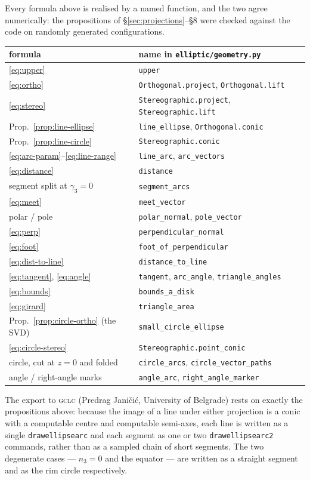\documentclass[11pt,a4paper]{article}
\newcommand{\code}[1]{\texttt{#1}}
\theoremstyle{plain}
\theoremstyle{definition}
\theoremstyle{remark}
\begin{document}
Every formula above is realised by a named function, and the two agree
numerically: the propositions of \S\ref{sec:projections}--\S8 were checked
against the code on randomly generated configurations.

\begin{center}
\small
\begin{tabular}{@{}ll@{}}
\toprule
\textbf{formula} & \textbf{name in \code{elliptic/geometry.py}} \\
\midrule
\eqref{eq:upper} & \code{upper} \\
\eqref{eq:ortho} & \code{Orthogonal.project}, \code{Orthogonal.lift} \\
\eqref{eq:stereo} & \code{Stereographic.project}, \code{Stereographic.lift} \\
Prop.~\ref{prop:line-ellipse} & \code{line\_ellipse}, \code{Orthogonal.conic} \\
Prop.~\ref{prop:line-circle} & \code{Stereographic.conic} \\
\eqref{eq:arc-param}--\eqref{eq:line-range} & \code{line\_arc}, \code{arc\_vectors} \\
\eqref{eq:distance} & \code{distance} \\
segment split at $\gamma_3=0$ & \code{segment\_arcs} \\
\eqref{eq:meet} & \code{meet\_vector} \\
polar / pole & \code{polar\_normal}, \code{pole\_vector} \\
\eqref{eq:perp} & \code{perpendicular\_normal} \\
\eqref{eq:foot} & \code{foot\_of\_perpendicular} \\
\eqref{eq:dist-to-line} & \code{distance\_to\_line} \\
\eqref{eq:tangent}, \eqref{eq:angle} & \code{tangent}, \code{arc\_angle}, \code{triangle\_angles} \\
\eqref{eq:bounds} & \code{bounds\_a\_disk} \\
\eqref{eq:girard} & \code{triangle\_area} \\
Prop.~\ref{prop:circle-ortho} (the SVD) & \code{small\_circle\_ellipse} \\
\eqref{eq:circle-stereo} & \code{Stereographic.point\_conic} \\
circle, cut at $z=0$ and folded & \code{circle\_arcs}, \code{circle\_vector\_paths} \\
angle / right-angle marks & \code{angle\_arc}, \code{right\_angle\_marker} \\
\bottomrule
\end{tabular}
\end{center}

The export to \textsc{gclc} (Predrag Janičić, University of Belgrade) rests on
exactly the propositions above: because the image of a line under either
projection is a conic with a computable centre and computable semi-axes, each
line is written as a single \code{drawellipsearc} and each segment as one or two
\code{drawellipsearc2} commands, rather than as a sampled chain of short
segments. The two degenerate cases --- $n_3=0$ and the equator --- are written
as a straight segment and as the rim circle respectively.
\end{document}

